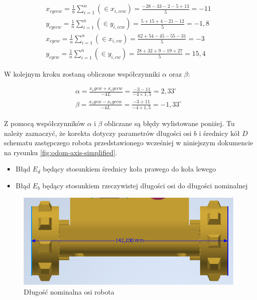 \begin{equation}
\begin{aligned}
    x_{cgccw} = \frac{1}{n}\sum_{i=1}^{n} (\in{x_{i,ccw}}) = \frac{-28-33-2-5+13}{5} = -11 \\[5pt]
    y_{cgccw} = \frac{1}{n}\sum_{i=1}^{n} (\in{y_{i,ccw}}) = \frac{5+15+4-21-12}{5} = -1,8 \\[5pt]
    x_{cgcw} = \frac{1}{n}\sum_{i=1}^{n} (\in{x_{i,cw}}) = \frac{62+54-45-55-31}{5} = -3 \\[5pt]
    y_{cgcw} = \frac{1}{n}\sum_{i=1}^{n} (\in{y_{i,cw}}) = \frac{28+32+9-19+27}{5} = 15,4
\end{aligned}
\end{equation}

W kolejnym kroku zostaną obliczone współczynniki $\alpha$ oraz $\beta$:

\begin{equation}
\begin{aligned}
    \alpha = \frac{x_cgcw + x_cgccw}{-4L} = \frac{-3 - 11}{-4 \times 1,5} = 2,33^{\circ} \\[5pt] 
    \beta = \frac{x_cgcw - x_cgccw}{-4L} = \frac{-3 + 11}{-4 \times 1,5} = -1,33^{\circ}
\end{aligned}
\end{equation}

Z pomocą współczynników $\alpha$ i $\beta$ obliczane są błędy wylistowane poniżej. Tu należy zaznaczyć, że korekta dotyczy parametrów długości osi $b$ i średnicy kół $D$ schematu zastępczego robota przedstawionego wcześniej w niniejszym dokumencie na rysunku \ref{fig:odom-axis-simplified}.

\begin{itemize}
    \item Błąd $E_{d}$ będący stosunkiem średnicy koła prawego do koła lewego
    \item Błąd $E_{b}$ będący stosunkiem rzeczywistej długości osi do długości nominalnej
\end{itemize}

\begin{figure}[ht]
	\centering
		\includegraphics[width=0.6\linewidth]{rys/axis-b-param.PNG}
	\caption{Długość nominalna osi robota}
    \label{fig:nominal-axis-width}
\end{figure}


